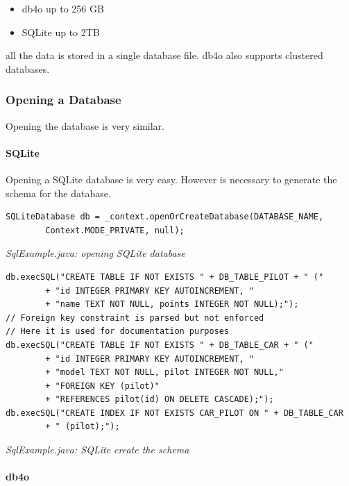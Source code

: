 \begin{itemize}
\item db4o up to 256 GB
\item SQLite up to 2TB
\end{itemize}

all the data is stored in a single database file. db4o also supports clustered databases.

\subsubsection{Opening a Database}
\label{ref:platform-specific-issues-android-opening-a-database}

Opening the database is very similar.

\paragraph*{SQLite}

Opening a SQLite database is very easy. However is necessary to generate the schema for the database.

\begin{lstlisting}
SQLiteDatabase db = _context.openOrCreateDatabase(DATABASE_NAME,
        Context.MODE_PRIVATE, null);
\end{lstlisting}

{\small\itshape SqlExample.java: opening SQLite database\par}
\medskip

\begin{lstlisting}
db.execSQL("CREATE TABLE IF NOT EXISTS " + DB_TABLE_PILOT + " ("
        + "id INTEGER PRIMARY KEY AUTOINCREMENT, "
        + "name TEXT NOT NULL, points INTEGER NOT NULL);");
// Foreign key constraint is parsed but not enforced
// Here it is used for documentation purposes
db.execSQL("CREATE TABLE IF NOT EXISTS " + DB_TABLE_CAR + " ("
        + "id INTEGER PRIMARY KEY AUTOINCREMENT, "
        + "model TEXT NOT NULL, pilot INTEGER NOT NULL,"
        + "FOREIGN KEY (pilot)"
        + "REFERENCES pilot(id) ON DELETE CASCADE);");
db.execSQL("CREATE INDEX IF NOT EXISTS CAR_PILOT ON " + DB_TABLE_CAR
        + " (pilot);");
\end{lstlisting}

{\small\itshape SqlExample.java: SQLite create the schema\par}
\medskip

\paragraph*{db4o}

